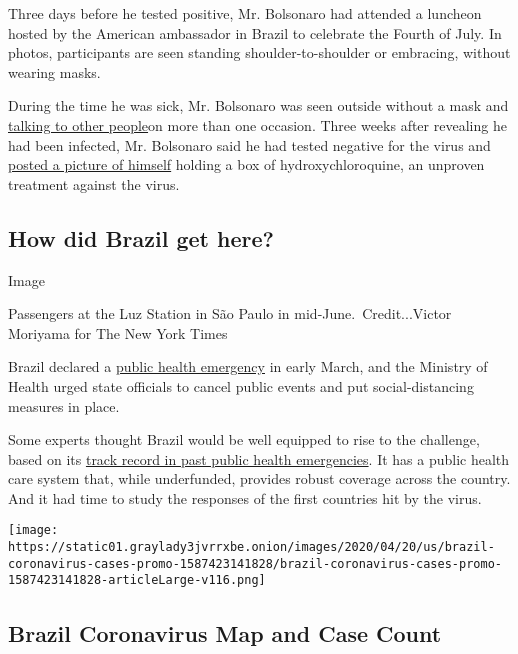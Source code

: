 Three days before he tested positive, Mr. Bolsonaro had attended a
luncheon hosted by the American ambassador in Brazil to celebrate the
Fourth of July. In photos, participants are seen standing
shoulder-to-shoulder or embracing, without wearing masks.

During the time he was sick, Mr. Bolsonaro was seen outside without a
mask and
\href{https://www1.folha.uol.com.br/poder/2020/07/com-covid-19-bolsonaro-passeia-de-moto-e-conversa-sem-mascara-com-garis-no-alvorada.shtml}{talking
to other people}on more than one occasion. Three weeks after revealing
he had been infected, Mr. Bolsonaro said he had tested negative for the
virus and
\href{https://twitter.com/jairbolsonaro/status/1286994557440348160}{posted
a picture of himself} holding a box of hydroxychloroquine, an unproven
treatment against the virus.

\hypertarget{how-did-brazil-get-here}{%
\subsection{How did Brazil get here?}\label{how-did-brazil-get-here}}

Image

Passengers at the Luz Station in São Paulo in mid-June.~Credit...Victor
Moriyama for The New York Times

Brazil declared a
\href{https://www1.folha.uol.com.br/equilibrioesaude/2020/02/governo-decreta-estado-de-emergencia-por-causa-de-surto-do-coronavirus.shtml}{public
health emergency} in early March, and the Ministry of Health urged state
officials to cancel public events and put social-distancing measures in
place.

Some experts thought Brazil would be well equipped to rise to the
challenge, based on its
\href{https://www.nytimes3xbfgragh.onion/2020/05/16/world/americas/virus-brazil-deaths.html}{track
record in past public health emergencies}. It has a public health care
system that, while underfunded, provides robust coverage across the
country. And it had time to study the responses of the first countries
hit by the virus.

\href{https://www.nytimes3xbfgragh.onion/interactive/2020/world/americas/brazil-coronavirus-cases.html}{}

\texttt{[image: https://static01.graylady3jvrrxbe.onion/images/2020/04/20/us/brazil-coronavirus-cases-promo-1587423141828/brazil-coronavirus-cases-promo-1587423141828-articleLarge-v116.png]}

\hypertarget{brazil-coronavirus-map-and-case-count}{%
\subsection{Brazil Coronavirus Map and Case
Count}\label{brazil-coronavirus-map-and-case-count}}

